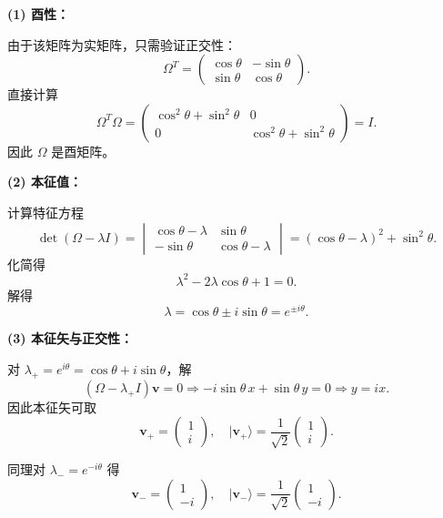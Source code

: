 \begin{solution}[二维旋转矩阵的酉对角化]
\answer

\vspace{0.3em}
\textbf{(1) 酉性：}

由于该矩阵为实矩阵，只需验证正交性：
\[
\Omega^T=
\begin{pmatrix}
\cos\theta & -\sin\theta\\
\sin\theta & \cos\theta
\end{pmatrix}.
\]
直接计算
\[
\Omega^T\Omega=
\begin{pmatrix}
\cos^2\theta+\sin^2\theta & 0\\
0 & \cos^2\theta+\sin^2\theta
\end{pmatrix}
=I.
\]
因此 $\Omega$ 是酉矩阵。

\vspace{0.5em}
\textbf{(2) 本征值：}

计算特征方程
\[
\det(\Omega-\lambda I)
=
\begin{vmatrix}
\cos\theta-\lambda & \sin\theta\\
-\sin\theta & \cos\theta-\lambda
\end{vmatrix}
= (\cos\theta-\lambda)^2+\sin^2\theta.
\]
化简得
\[
\lambda^2-2\lambda\cos\theta+1=0.
\]
解得
\[
\lambda=\cos\theta \pm i\sin\theta = e^{\pm i\theta}.
\]

\vspace{0.5em}
\textbf{(3) 本征矢与正交性：}

对 $\lambda_+=e^{i\theta}=\cos\theta+i\sin\theta$，解
\[
(\Omega-\lambda_+ I)\mathbf{v}=0
\Rightarrow
-i\sin\theta\, x + \sin\theta\, y=0
\Rightarrow y=i x.
\]
因此本征矢可取
\[
\mathbf{v}_+=\begin{pmatrix}1\\ i\end{pmatrix},
\quad
|\mathbf{v}_+\rangle=\frac{1}{\sqrt{2}}\begin{pmatrix}1\\ i\end{pmatrix}.
\]

同理对 $\lambda_-=e^{-i\theta}$ 得
\[
\mathbf{v}_-=\begin{pmatrix}1\\ -i\end{pmatrix},
\quad
|\mathbf{v}_-\rangle=\frac{1}{\sqrt{2}}\begin{pmatrix}1\\ -i\end{pmatrix}.
\]


\end{solution}
